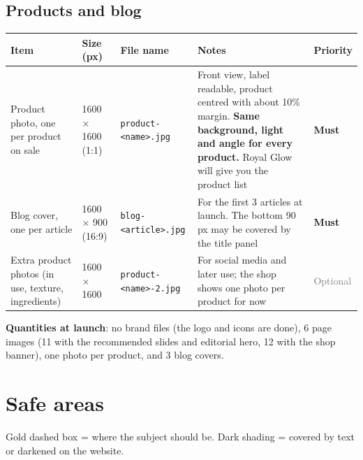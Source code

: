 \documentclass[11pt,a4paper]{article}
\newcommand{\key}[1]{{\footnotesize\texttt{#1}}}
\newcommand{\must}{\textbf{\textcolor{golddeep}{Must}}}
\newcommand{\opt}{\textcolor{gray}{Optional}}
\begin{document}
\subsection{Products and blog}
\begin{longtable}{@{}P{3.2cm} P{2.1cm} P{3.9cm} P{3.75cm} l@{}}
\toprule
\textbf{Item} & \textbf{Size (px)} & \textbf{File name} & \textbf{Notes} & \textbf{Priority} \\ \midrule\endhead
Product photo, one per product on sale & 1600 × 1600 (1:1) & \key{product-<name>.jpg} & Front view, label readable, product centred with about 10\% margin. \textbf{Same background, light and angle for every product.} Royal Glow will give you the product list & \must \\
Blog cover, one per article & 1600 × 900 (16:9) & \key{blog-<article>.jpg} & For the first 3 articles at launch. The bottom 90\,px may be covered by the title panel & \must \\
Extra product photos (in use, texture, ingredients) & 1600 × 1600 & \key{product-<name>-2.jpg} & For social media and later use; the shop shows one photo per product for now & \opt \\ \bottomrule
\end{longtable}

\textbf{Quantities at launch}: no brand files (the logo and icons are done), 6 page images (11 with the recommended slides and editorial hero, 12 with the shop banner), one photo per product, and 3 blog covers.

\section{Safe areas}\label{sec:safe}
Gold dashed box = where the subject should be. Dark shading = covered by text or darkened on the website.
\end{document}
